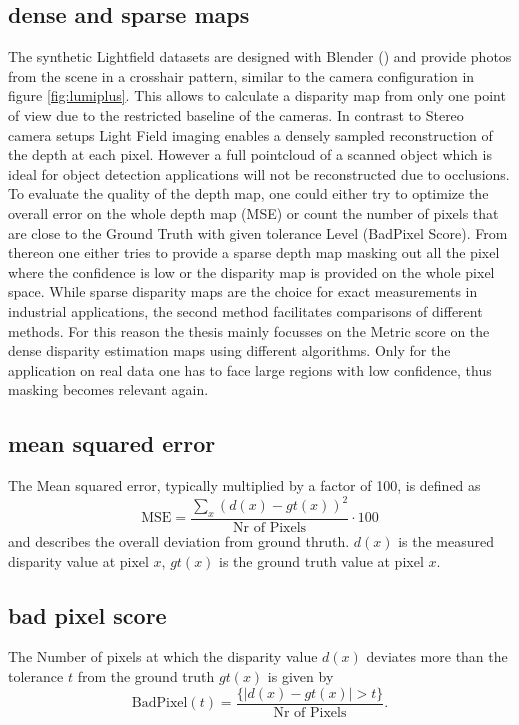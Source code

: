 \documentclass  [
  paper    = a4,
  BCOR     = 10mm,
  twoside,
  fontsize = 12pt,
  fleqn,
  toc      = bibnumbered,
  toc      = listofnumbered,
  numbers  = noendperiod,
  headings = normal,
  listof   = leveldown,
  version  = 3.03
]                                       {scrreprt}
\begin{document}
\subsection{dense and sparse maps}
The synthetic Lightfield datasets are designed with Blender (\cite{blender2014blender}) and provide photos from the scene in a crosshair pattern, similar to the camera configuration in figure \ref{fig:lumiplus}. This allows to calculate a disparity map from only one point of view due to the restricted baseline of the cameras. In contrast to Stereo camera setups Light Field imaging enables a densely sampled reconstruction of the depth at each pixel. However a full pointcloud of a scanned object  which is ideal for object detection applications will not be reconstructed due to occlusions. To evaluate the quality of the depth map, one could either try to optimize the overall error on the whole depth map (MSE) or count the number of pixels that are close to the Ground Truth with given tolerance Level (BadPixel Score). From thereon one either tries to provide a sparse depth map masking out all the pixel where the confidence is low or the disparity map is provided on the whole pixel space. While sparse disparity maps are the choice for exact measurements in industrial applications, the second method facilitates comparisons of different methods. For this reason the thesis mainly focusses on the Metric score on the dense disparity estimation maps using different algorithms. Only for the application on real data one has to face large regions with low confidence, thus masking becomes relevant again.
\subsection{mean squared error}
The Mean squared error, typically multiplied by a factor of 100, is defined as 
\begin{equation}\label{key}
\text{MSE} = \frac{\sum_x (d(x) - gt(x))^2}{\text{Nr of Pixels}} \cdot 100
\end{equation}
and describes the overall deviation from ground thruth. $d(x)$ is the measured disparity value at pixel $x$, $gt(x)$ is the ground truth value at pixel $x$. 
\subsection{bad pixel score}
The Number of pixels at which the disparity value $d(x)$ deviates more than the tolerance $t$ from the ground truth $gt(x)$ is given by
\begin{equation}\label{key}
\text{BadPixel}(t) = \frac{\{|d(x) - gt(x)| > t \}}{\text{Nr of Pixels}}.
\end{equation}
\end{document}
